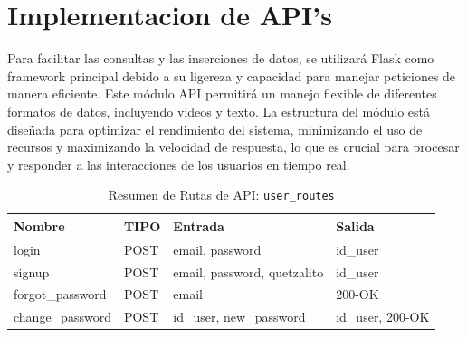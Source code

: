
\section{Implementacion de API's}

Para facilitar las consultas y las inserciones de datos, se utilizará Flask como framework principal debido a su ligereza y capacidad para manejar peticiones de manera eficiente. Este módulo API permitirá un manejo flexible de diferentes formatos de datos, incluyendo videos y texto. La estructura del módulo está diseñada para optimizar el rendimiento del sistema, minimizando el uso de recursos y maximizando la velocidad de respuesta, lo que es crucial para procesar y responder a las interacciones de los usuarios en tiempo real.



\begin{table}[H]
\centering
\begin{tabularx}{\textwidth}{|l|l|l|X|}
\hline
\textbf{Nombre} & \textbf{TIPO} & \textbf{Entrada} & \textbf{Salida} \\ \hline
login & POST & email, password & id\_user \\ \hline
signup & POST & email, password, quetzalito & id\_user \\ \hline
forgot\_password & POST & email & 200-OK \\ \hline
change\_password & POST & id\_user, new\_password & id\_user, 200-OK \\ \hline
\end{tabularx}
\caption{Resumen de Rutas de API: \texttt{user\_routes}}
\label{tab:user_routes}
\end{table}

